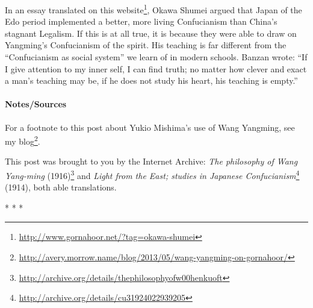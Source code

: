 In an essay translated on this website\footnote{\url{http://www.gornahoor.net/?tag=okawa-shumei}}, Okawa Shumei argued that Japan of the Edo period implemented a better, more living Confucianism than China's stagnant Legalism. If this is at all true, it is because they were able to draw on Yangming's Confucianism of the spirit. His teaching is far different from the “Confucianism as social system” we learn of in modern schools. Banzan wrote: “If I give attention to my inner self, I can find truth; no matter how clever and exact a man's teaching may be, if he does not study his heart, his teaching is empty.”

\paragraph{Notes/Sources}
For a footnote to this post about Yukio Mishima's use of Wang Yangming, see my blog\footnote{\url{http://avery.morrow.name/blog/2013/05/wang-yangming-on-gornahoor/}}.

This post was brought to you by the Internet Archive: \textit{The philosophy of Wang Yang-ming} (1916)\footnote{\url{http://archive.org/details/thephilosophyofw00henkuoft}} and \textit{Light from the East; studies in Japanese Confucianism}\footnote{\url{http://archive.org/details/cu31924022939205}} (1914), both able translations.


\begin{center}* * *\end{center}

